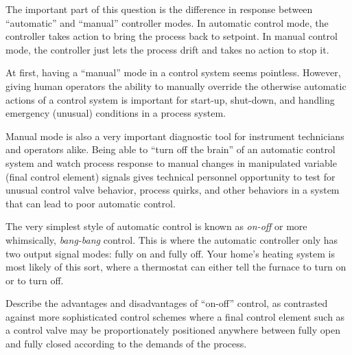 \vskip 10pt

The important part of this question is the difference in response between ``automatic'' and ``manual'' controller modes.  In automatic control mode, the controller takes action to bring the process back to setpoint.  In manual control mode, the controller just lets the process drift and takes no action to stop it.

At first, having a ``manual'' mode in a control system seems pointless.  However, giving human operators the ability to manually override the otherwise automatic actions of a control system is important for start-up, shut-down, and handling emergency (unusual) conditions in a process system.  

Manual mode is also a very important diagnostic tool for instrument technicians and operators alike.  Being able to ``turn off the brain'' of an automatic control system and watch process response to manual changes in manipulated variable (final control element) signals gives technical personnel opportunity to test for unusual control valve behavior, process quirks, and other behaviors in a system that can lead to poor automatic control. 
















The very simplest style of automatic control is known as {\it on-off} or more whimsically, {\it bang-bang} control.  This is where the automatic controller only has two output signal modes: fully on and fully off.  Your home's heating system is most likely of this sort, where a thermostat can either tell the furnace to turn on or to turn off.

Describe the advantages and disadvantages of ``on-off'' control, as contrasted against more sophisticated control schemes where a final control element such as a control valve may be proportionately positioned anywhere between fully open and fully closed according to the demands of the process.

